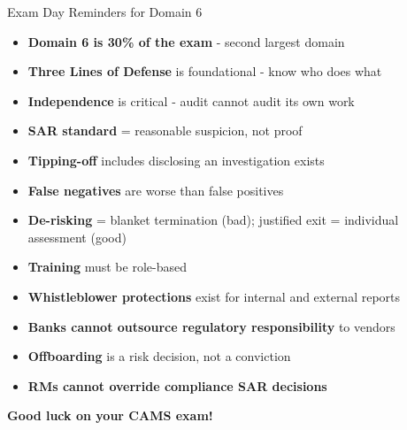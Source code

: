 \documentclass[11pt,a4paper]{beamer}
\newcommand{\greennote}[1]{\textcolor{green!50!black}{\textbf{#1}}}
\begin{document}
	\begin{frame}{Exam Day Reminders for Domain 6}
		\begin{itemize}
			\item \textbf{Domain 6 is 30\% of the exam} - second largest domain
			\item \textbf{Three Lines of Defense} is foundational - know who does what
			\item \textbf{Independence} is critical - audit cannot audit its own work
			\item \textbf{SAR standard} = reasonable suspicion, not proof
			\item \textbf{Tipping-off} includes disclosing an investigation exists
			\item \textbf{False negatives} are worse than false positives
			\item \textbf{De-risking} = blanket termination (bad); justified exit = individual assessment (good)
			\item \textbf{Training} must be role-based
			\item \textbf{Whistleblower protections} exist for internal and external reports
			\item \textbf{Banks cannot outsource regulatory responsibility} to vendors
			\item \textbf{Offboarding} is a risk decision, not a conviction
			\item \textbf{RMs cannot override compliance SAR decisions}
		\end{itemize}
		\vspace{0.5cm}
		\centering
		\greennote{\Large Good luck on your CAMS exam!}
	\end{frame}
	
\end{document}
